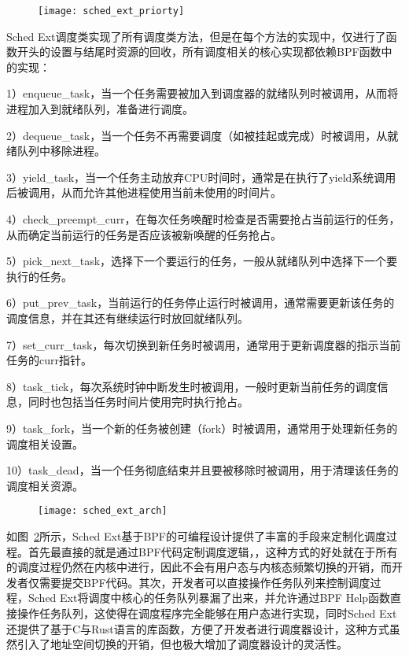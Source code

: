 \begin{figure}[!htbp]
    \centering
    \texttt{[image: sched\_ext\_priorty]}
    \label{fig:sched_ext_priorty}
\end{figure}

Sched Ext调度类实现了所有调度类方法，但是在每个方法的实现中，仅进行了函数开头的设置与结尾时资源的回收，所有调度相关的核心实现都依赖BPF函数中的实现：

1）enqueue_task，当一个任务需要被加入到调度器的就绪队列时被调用，从而将进程加入到就绪队列，准备进行调度。

2）dequeue_task，当一个任务不再需要调度（如被挂起或完成）时被调用，从就绪队列中移除进程。

3）yield_task，当一个任务主动放弃CPU时间时，通常是在执行了yield系统调用后被调用，从而允许其他进程使用当前未使用的时间片。

4）check_preempt_curr，在每次任务唤醒时检查是否需要抢占当前运行的任务，从而确定当前运行的任务是否应该被新唤醒的任务抢占。

5）pick_next_task，选择下一个要运行的任务，一般从就绪队列中选择下一个要执行的任务。

6）put_prev_task，当前运行的任务停止运行时被调用，通常需要更新该任务的调度信息，并在其还有继续运行时放回就绪队列。

7）set_curr_task，每次切换到新任务时被调用，通常用于更新调度器的指示当前任务的curr指针。

8）task_tick，每次系统时钟中断发生时被调用，一般时更新当前任务的调度信息，同时也包括当任务时间片使用完时执行抢占。

9）task_fork，当一个新的任务被创建（fork）时被调用，通常用于处理新任务的调度相关设置。

10）task_dead，当一个任务彻底结束并且要被移除时被调用，用于清理该任务的调度相关资源。


\begin{figure}[!htbp]
    \centering
    \texttt{[image: sched\_ext\_arch]}
    \label{fig:sched_ext_arch}
\end{figure}

如图~\ref{fig:sched_ext_arch}所示，Sched Ext基于BPF的可编程设计提供了丰富的手段来定制化调度过程。首先最直接的就是通过BPF代码定制调度逻辑，，这种方式的好处就在于所有的调度过程仍然在内核中进行，因此不会有用户态与内核态频繁切换的开销，而开发者仅需要提交BPF代码。其次，开发者可以直接操作任务队列来控制调度过程，Sched Ext将调度中核心的任务队列暴漏了出来，并允许通过BPF Help函数直接操作任务队列，这使得在调度程序完全能够在用户态进行实现，同时Sched Ext还提供了基于C与Rust语言的库函数，方便了开发者进行调度器设计，这种方式虽然引入了地址空间切换的开销，但也极大增加了调度器设计的灵活性。

